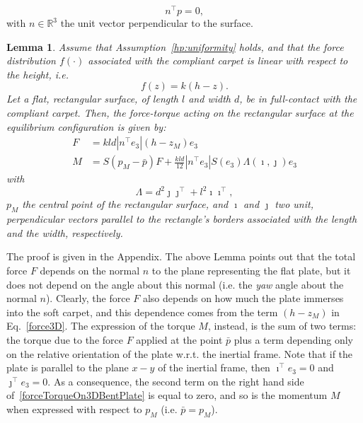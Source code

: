 \documentclass[12pt,a4paper,twoside]{article}
\newtheorem{boldLemma}{\bf{Lemma}}
\begin{document}
\begin{equation}
\label{distributionPlane}
n^\top p = 0,
\end{equation} 
with $n \in \mathbb{R}^3$ the unit vector perpendicular to the  surface.

\begin{boldLemma}
\label{lemma3D}
Assume that Assumption~\ref{hp:uniformity} holds, and that the force distribution $f(\cdot)$ associated with the compliant carpet  is linear with respect to the height, i.e.
\begin{equation}
\label{distributionLinear3D}
f(z) = k(h-z).
\end{equation}
Let a flat, rectangular surface, of length $l$ and width $d$, be in full-contact with the compliant carpet. Then, the force-torque acting on the  rectangular surface at the equilibrium configuration is given by: 
\begin{subequations}
\label{forceTorqueOn3DBentPlate}
    \begin{alignat}{2}
\label{force3D}
F &= kld|n^\top e_3|\left(h-z_M \right)e_3 \\
\label{torque3D}
M &= S(p_M - \bar{p})F + \frac{kld}{12}|n^\top e_3|S(e_3)\Lambda(\imath,\jmath)e_3 
    \end{alignat}
\end{subequations}
with 
\begin{equation}
\Lambda = d^2 \jmath \jmath^\top + l^2 \imath \imath^\top ,
\end{equation}
 $p_M$  the central point of the rectangular surface,  
and $\imath$ and 
$\jmath$ two unit, perpendicular vectors parallel to the rectangle's borders associated with the length and the width, respectively.
\end{boldLemma}

The proof is given in the Appendix. The above Lemma points out that the total force $F$ depends on the normal $n$ to the plane representing the flat plate, but it does not depend on the angle about this normal (i.e. the \emph{yaw} angle about the normal $n$). Clearly, the force $F$ also depends on how much the  plate immerses into the soft carpet, and this dependence comes from the term $(h-z_M)$ in Eq.~\eqref{force3D}. The expression of the torque $M$, instead, is the sum of two terms: the torque due to the force $F$ applied at the point  $\bar{p}$ plus a term  depending only on the relative orientation of the plate w.r.t. the inertial frame. Note that if the plate is parallel to the plane $x-y$ of the inertial frame, then $\imath^\top e_3 = 0$ and 
$\jmath^\top e_3 = 0$. As a consequence, the second term on the right hand side of~\eqref{forceTorqueOn3DBentPlate} is equal to zero, and so is the momentum $M$ when expressed with respect to $p_M$ (i.e. $\bar{p}=p_M$). 
\end{document}

